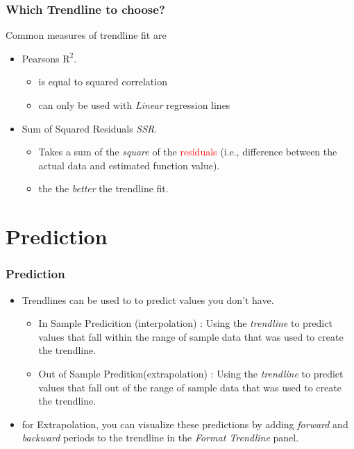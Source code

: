 \documentclass[12pt]{beamer}
\begin{document}
	\begin{frame}
		\frametitle{Which Trendline to choose?}
		Common measures of trendline fit are 
		\begin{itemize}
			\item Pearsons $\text{R}^2$. 
			\begin{itemize}
				\item is equal to squared correlation
				\item can only be used with \textit{Linear} regression lines
			\end{itemize}
			\item Sum of Squared Residuals \textit{SSR}.
			\begin{itemize}
				\item Takes a sum of the \textit{square} of the \textcolor{red}{residuals} (i.e., difference between the actual data and estimated function value).
				\item the  the \textit{better} the trendline fit.  
			\end{itemize}
		\end{itemize}
	\end{frame}
\section{Prediction}
	\begin{frame}
		\frametitle{Prediction}
		\begin{itemize}
			\item Trendlines can be used to to predict values you don't have. 
				\begin{itemize}
					\item In Sample Predicition (interpolation) : Using the \textit{trendline} to predict values that fall within the range of sample data that was used to create the trendline.
					\item Out of Sample Predition(extrapolation) : Using the \textit{trendline} to predict values that fall out of the range of sample data that was used to create the trendline.
			\end{itemize}
		\item for Extrapolation, you can visualize these predictions by adding \textit{forward} and \textit{backward} periods to the trendline in the \textit{Format Trendline} panel.
	\end{itemize}
	\end{frame}
\end{document}
